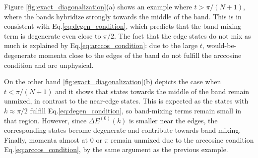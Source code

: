 \documentclass{article}
\begin{document}
Figure \ref{fig:exact_diagonalization}(a) shows an example where $t>\pi/(N+1)$, where the bands hybridize strongly towards the middle of the band. This is in consistent with Eq.\eqref{eq:degen_condition}, which predicts that the band-mixing term is degenerate even close to $\pi/2$. The fact that the edge states do not mix as much is explained by Eq.\eqref{eq:arccos_condition}: due to the large $t$, would-be-degenerate momenta close to the edges of the band do not fulfill the arccosine condition and are unphysical.

On the other hand \ref{fig:exact_diagonalization}(b) depicts the case when  $t<\pi/(N+1)$ and it shows that states towards the middle of the band remain unmixed, in contrast to the near-edge states. This is expected as the states with $k\approx \pi/2$ fulfill Eq.\eqref{eq:degen_condition}, so band-mixing terms remain small in that region. However, since $\Delta E^{(0)}(k)$ is smaller near the edges, the corresponding states become degenerate and contribute towards band-mixing. Finally, momenta almost at $0$ or $\pi$ remain unmixed due to the arccosine condition Eq.\eqref{eq:arccos_condition}, by the same argument as the previous example.
\end{document}
